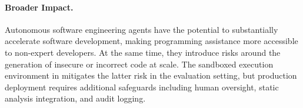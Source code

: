 \paragraph{Broader Impact.}
Autonomous software engineering agents have the potential
to substantially accelerate software development,
making programming assistance more accessible to
non-expert developers. At the same time, they introduce
risks around the generation of insecure or incorrect
code at scale. The sandboxed execution environment in
\agentforge{} mitigates the latter risk in the
evaluation setting, but production deployment requires
additional safeguards including human oversight,
static analysis integration, and audit logging.
